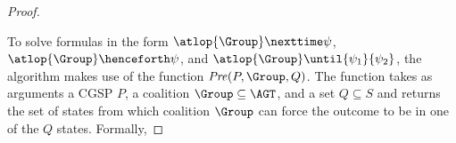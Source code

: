 \begin{proof}
\begin{breakablealgorithm}
\begin{algorithmic}[1]
        \Case {$\varphi = \lnot \psi$}
        \EndCase
       \Case {$\varphi = \psi \land \chi$}
        \EndCase
      \Case {$\varphi =  \atlop{\Group} \nexttime \psi$}
        \EndCase
        \Case {$\varphi =  \atlop{\Group} \henceforth \psi$}
            \While{$\rho \nsubseteq \tau$}
             \EndWhile
        \EndCase
            \While{$\tau \nsubseteq \rho$}
             \EndWhile
        \EndCase
        \Case {$\varphi =  \atloprat{\Group} \nexttime \psi$}
        \EndCase
        \Case {$\varphi =  \atloprat{\Group} \henceforth \psi$}
            \While{$\rho \nsubseteq \tau$}
             \EndWhile
        \EndCase
            \While{$\tau \nsubseteq \rho$}
             \EndWhile
        \EndCase
    \EndProcedure
	\end{algorithmic}
\end{breakablealgorithm}

To solve formulas in the form $\atlop{\Group} \nexttime \psi$, $\atlop{\Group} \henceforth \psi$, and $\atlop{\Group} \until{\psi_1}{\psi_2}$, the algorithm makes use of the function $\mathit{Pre}(P, \Group, Q)$. The function  takes as arguments a CGSP $P$, a coalition $\Group \subseteq \AGT$, and a set $Q \subseteq S$ and returns the set of states from which coalition $\Group$ can force the outcome to be in one of the $Q$ states. 
Formally, 


\end{proof}
